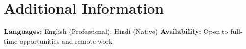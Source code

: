 \documentclass[letterpaper,10pt]{article}
\begin{document}
\section{Additional Information}
\begin{itemize}[leftmargin=0.1in, label={}, itemsep=0pt]
\small{
    \item \textbf{Languages:} English (Professional), Hindi (Native) \quad \textbf{Availability:} Open to full-time opportunities and remote work
}
\end{itemize}
\end{document}
